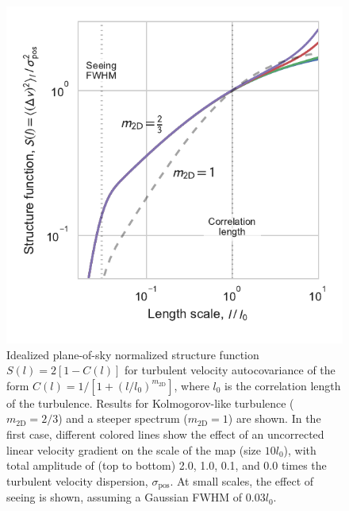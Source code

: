 \documentclass[useAMS,usenatbib]{mn2e}
\begin{document}
\newcommand\fakesc[1]{\protect\scalebox{1.0}[0.8]{#1}}
\newcommand\ION[2]{\ensuremath{\mathrm{#1\,\fakesc{#2}}}}
\newcommand\ion[2]{\setcounter{ion}{#2}\ION{#1}{\Roman{ion}}}
\newcommand\hii{\ion{H}{2}}
\newcommand\oi{[\ion{O}{1}]}
\newcommand\oiii{[\ion{O}{3}]}
\newcommand\nii{[\ion{N}{2}]}
\newcommand\sii{[\ion{S}{2}]}
\newcommand\siii{[\ion{S}{3}]}
\newcommand\ha{\ensuremath{\mathrm{H\alpha}}}
\newcommand\kms{\ensuremath{\mathrm{km\ s^{-1}}}}
\newcommand\los{\ensuremath{_{\mathrm{los}}}}
\newcommand\pos{\ensuremath{_{\mathrm{pos}}}}
\newcommand\obs{\ensuremath{_{\mathrm{obs}}}}
\newcommand\ins{\ensuremath{_{\mathrm{ins}}}}
\newcommand\rms{\ensuremath{_{\mathrm{rms}}}}
\newcommand\FS{\ensuremath{_{\mathrm{fs}}}}
\newcommand\therm{\ensuremath{_{\mathrm{therm}}}}


\begin{figure}
  \centering
  \includegraphics[width=\linewidth]{strucfunc-ideal}
  \caption{Idealized plane-of-sky normalized structure function
    \(S(l) = 2\left[ 1 - C(l) \right]\) for turbulent velocity
    autocovariance of the form
    \(C(l) = 1/\left[1 + (l/l_0)^{m_\mathrm{2D}}\right]\), where
    \(l_0\) is the correlation length of the turbulence. Results for
    Kolmogorov-like turbulence (\(m_\mathrm{2D} = 2/3\)) and a steeper
    spectrum (\(m_\mathrm{2D} = 1\)) are shown.  In the first case,
    different colored lines show the effect of an uncorrected
    linear velocity gradient on the scale of the map (size \(10
    l_0\)), with total amplitude of (top to bottom) 2.0, 1.0, 0.1, and
    0.0 times the turbulent velocity dispersion,
    \(\sigma_\mathrm{pos}\).  At small scales, the effect of seeing
    is shown, assuming a Gaussian FWHM of \(0.03 l_0\). 
  }
  \label{fig:sf-ideal}
\end{figure}
\end{document}
